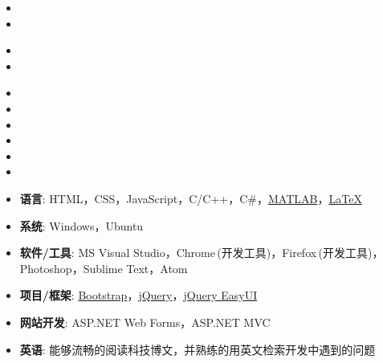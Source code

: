 \documentclass[letterpaper,11pt]{article}
\begin{document}
  \begin{itemize}[leftmargin=*]
    \item
    \item
  \end{itemize}

  \begin{itemize}[leftmargin=*]
    \item
    \item
  \end{itemize}

\newpage

  \begin{itemize}[leftmargin=*]
    \item {}
    \item {}
    \item {}
    \item {}
    \item {}
    \item {}
  \end{itemize}

  \begin{itemize}[leftmargin=*]
    \item \textbf{语言}: HTML，CSS，JavaScript，C/C++，C\#，\href{http://cn.mathworks.com/products/matlab/}{MATLAB}，\href{http://www.latex-project.org/}{\LaTeX}
    \item \textbf{系统}: Windows，Ubuntu
    \item \textbf{软件/工具}: MS Visual Studio，Chrome$\,$(开发工具)，Firefox$\,$(开发工具)，Photoshop，Sublime Text，Atom
    \item \textbf{项目/框架}: \href{http://www.bootcss.com/}{Bootstrap}，\href{https://jquery.com/}{jQuery}，\href{http://jeasyui.com/}{jQuery EasyUI}
    \item \textbf{网站开发}: ASP.NET Web Forms，ASP.NET MVC
    \item \textbf{英语}: 能够流畅的阅读科技博文，并熟练的用英文检索开发中遇到的问题
  \end{itemize}
\end{document}
